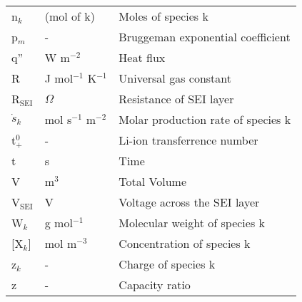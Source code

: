 \documentclass[12pt]{article}
\begin{document}
\begin{table}[]
\begin{tabular}{lll}
		n$_k$        		& (mol of k)   				& Moles of species k            \\
		p$_m$        		& -		     				& Bruggeman exponential coefficient           \\
		q''        			& W m$^{-2}$     			& Heat flux            \\
		R         			& J mol$^{-1}$ K$^{-1}$ 	& Universal gas constant            \\
		R$_\textrm{SEI}$	& $\Omega$     				& Resistance of SEI layer            \\
		$\dot{s}_k$     	& mol s$^{-1}$ m$^{-2}$ 	& Molar production rate of species k            \\
		t$_+^0$         	& -     					& Li-ion transferrence number            \\
		t               	& s     					& Time            \\
		V         			& m$^{3}$     				& Total Volume            \\
		V$_\textrm{SEI}$	& V     					& Voltage across the SEI layer            \\
		W$_k$        		& g mol$^{-1}$      		& Molecular weight of species k            \\
		{[}X$_k${]}     	& mol m$^{-3}$     			& Concentration of species k            \\
		z$_k$        		& -     					& Charge of species k            \\         
		z	        		& -     					& Capacity ratio            \\         
	\end{tabular}
\end{table}
\end{document}
